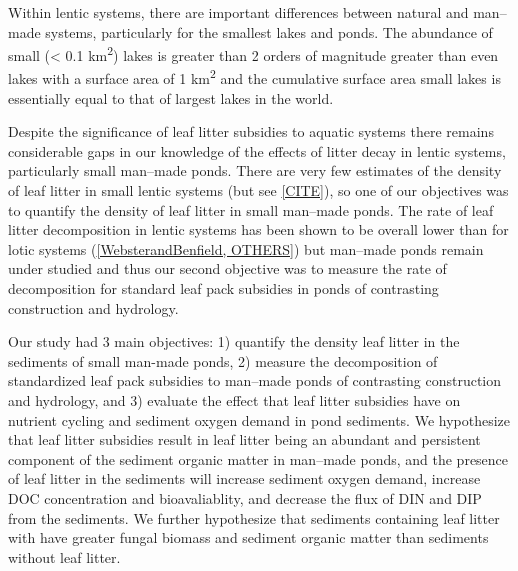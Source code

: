 Within lentic systems, there are important differences between natural and man--made systems, particularly for the smallest lakes and ponds. The abundance of small (< 0.1 km\textsuperscript{2}) lakes is greater than 2 orders of magnitude greater than even lakes with a surface area of 1 km\textsuperscript{2} \cite{Downing_2010} and the cumulative surface area small lakes is essentially equal to that of largest lakes in the world.  

Despite the significance of leaf litter subsidies to aquatic systems there remains considerable gaps in our knowledge of the effects of litter decay in lentic systems, particularly small man--made ponds.  There are very few estimates of the density of leaf litter in small lentic systems (but see \ref{CITE}), so one of our objectives was to quantify the density of leaf litter in small man--made ponds. The rate of leaf litter decomposition in lentic systems has been shown to be overall lower than for lotic systems (\ref{WebsterandBenfield, OTHERS}) but man--made ponds remain under studied and thus our second objective was to measure the rate of decomposition for standard leaf pack subsidies in ponds of contrasting construction and hydrology.  

Our study had 3 main objectives: 1) quantify the density leaf litter in the sediments of small man-made ponds, 2) measure the decomposition of standardized leaf pack subsidies to man--made ponds of contrasting construction and hydrology, and 3) evaluate the effect that leaf litter subsidies have on nutrient cycling and sediment oxygen demand in pond sediments. We hypothesize that leaf litter subsidies result in leaf litter being an abundant and persistent component of the sediment organic matter in man--made ponds, and the presence of leaf litter in the sediments will increase sediment oxygen demand, increase DOC concentration and bioavaliablity, and decrease the flux of DIN and DIP from the sediments. We further hypothesize that sediments containing leaf litter with have greater fungal biomass and sediment organic matter than sediments without leaf litter.